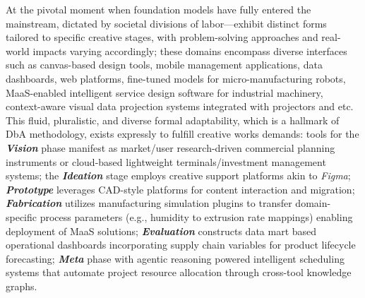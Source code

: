 At the pivotal moment when foundation models have fully entered the mainstream, dictated by societal divisions of labor\cite{hsueh2024counts}—exhibit distinct forms tailored to specific creative stages, with problem-solving approaches and real-world impacts varying accordingly\cite{shao2025future}; these domains encompass diverse interfaces such as canvas-based design tools, mobile management applications, data dashboards, web platforms, fine-tuned models for micro-manufacturing robots\cite{rigaud2022exploring}, MaaS-enabled intelligent service design software for industrial machinery\cite{zhang2020deep}, context-aware visual data projection systems integrated with projectors and etc. This fluid, pluralistic, and diverse formal adaptability, which is a hallmark of DbA methodology, exists expressly to fulfill creative works demands: tools for the \textbf{\textit{Vision}} phase manifest as market/user research-driven commercial planning instruments or cloud-based lightweight terminals/investment management systems; the \textit{\textbf{Ideation}} stage employs creative support platforms akin to \textit{Figma}\cite{figma2025}; \textbf{\textit{Prototype}} leverages CAD-style platforms for content interaction and migration; \textbf{\textit{Fabrication}} utilizes manufacturing simulation plugins to transfer domain-specific process parameters (e.g., humidity to extrusion rate mappings) enabling deployment of MaaS solutions; \textbf{\textit{Evaluation}} constructs data mart based operational dashboards incorporating supply chain variables for product lifecycle forecasting; \textit{\textbf{Meta}} phase with agentic reasoning\cite{wu2025agentic} powered intelligent scheduling systems that automate project resource allocation through cross-tool knowledge graphs.

